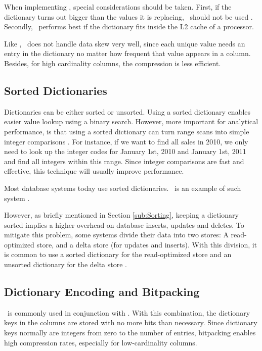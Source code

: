 When implementing \de, special considerations should be taken. First, if the dictionary turns out bigger than the values it is replacing, \de~should not be used \cite{Holloway2008-rr}. Secondly, \de~performs best if the dictionary fits inside the L2 cache of a processor.

Like \bp, \de~does not handle data skew very well, since each unique value needs an entry in the dictionary no matter how frequent that value appears in a column. Besides, for high cardinality columns, the compression is less efficient.

\subsection{Sorted Dictionaries}
\label{sub:Sorted Dictionaries}
Dictionaries can be either sorted or unsorted. Using a sorted dictionary enables easier value lookup using a binary search. However, more important for analytical performance, is that using a sorted dictionary can turn range scans into simple integer comparisons \cite{Faust2015-ke}. For instance, if we want to find all sales in 2010, we only need to look up the integer codes for January 1st, 2010 and January 1st, 2011 and find all integers within this range. Since integer comparisons are fast and effective, this technique will usually improve performance. 

Most database systems today use sorted dictionaries. \saph~is an example of such system \cite{Farber2012-vh}.

However, as briefly mentioned in Section \ref{sub:Sorting}, keeping a dictionary sorted implies a higher overhead on database inserts, updates and deletes. To mitigate this problem, some systems divide their data into two stores: A read-optimized store, and a delta store (for updates and inserts). With this division, it is common to use a sorted dictionary for the read-optimized store and an unsorted dictionary for the delta store \cite{Plattner2014-fr}.

\subsection{Dictionary Encoding and Bitpacking}
\label{sub:Dictionary Encoding and Bitpacking}
\de~is commonly used in conjunction with \bp. With this combination, the dictionary keys in the columns are stored with no more bits than necessary. Since dictionary keys normally are integers from zero to the number of entries, bitpacking enables high compression rates, especially for low-cardinality columns.

